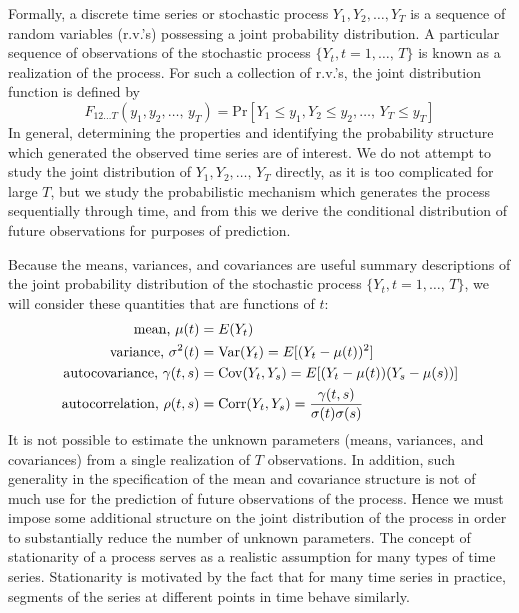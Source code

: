 Formally, a discrete time series or stochastic process $Y_1, Y_2, \ldots, Y_T$ is a sequence of random variables (r.v.'s) possessing a joint probability distribution. A particular sequence of observations of the stochastic process $\{ Y_t, t=1, \ldots,  \, T\}$ is known as a realization of the process. For such a collection of r.v.'s, the joint distribution function is defined by
	\begin{equation} \label{eqn:feqnfirst}
	F_{12 \ldots T} \left(y_1, y_2, \ldots,  \, y_T \right)= \text{Pr}[Y_1 \leq y_1, Y_2 \leq y_2, \ldots,  	\, Y_T \leq y_T]
	\end{equation}
In general, determining the properties and identifying the probability structure which generated the observed time series are of interest. We do not attempt to study the joint distribution of $Y_1, Y_2, \ldots, \, Y_T$ directly, as it is too complicated for large $T$, but we study the probabilistic mechanism which generates the process sequentially through time, and from this we derive the conditional distribution of future observations for purposes of prediction.


Because the means, variances, and covariances are useful summary descriptions of the joint probability distribution of the stochastic process $\{ Y_t, t=1, \ldots,  \, T\}$, we will consider these quantities that are functions of $t$:
	\begin{equation} \label{eqn:texteqn}
	\begin{split}
	\text{mean, } \mu(t)&= E(Y_t) \\
	\text{variance, } \sigma^2(t)&= \var(Y_t)= E[(Y_t - \mu(t))^2] \\
	\text{autocovariance, } \gamma(t,s)&= \cov(Y_t,Y_s)= E[(Y_t-\mu(t))(Y_s - \mu(s))] \\
	\text{autocorrelation, } \rho(t,s)&= \corr(Y_t,Y_s)= \dfrac{\gamma(t,s)}{\sigma(t)\sigma(s)}
	\end{split}
	\end{equation}
It is not possible to estimate the unknown parameters (means, variances, and covariances) from a single realization of $T$ observations. In addition, such generality in the specification of the mean and covariance structure is not of much use for the prediction of future observations of the process. Hence we must impose some additional structure on the joint distribution of the process in order to substantially reduce the number of unknown parameters. The concept of stationarity of a process serves as a realistic assumption for many types of time series. Stationarity is motivated by the fact that for many time series in practice, segments of the series at different points in time behave similarly. \twomedskip


